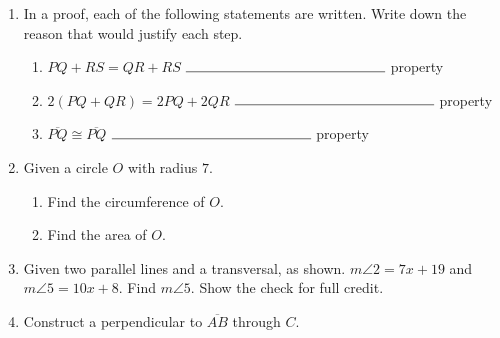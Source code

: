 \begin{enumerate}
\item In a proof, each of the following statements are written. Write down the reason that would justify each step. \bigskip
\begin{enumerate}
  \item $PQ+RS= QR+RS$  \hspace{1.7cm} $\rule{5cm}{0.15mm}$ property  \bigskip
  \item $2(PQ + QR)=2PQ+2QR$  \hspace{0.6cm} $\rule{5cm}{0.15mm}$ property \bigskip
  \item $\overline{PQ} \cong \overline{PQ}$ \hspace{4cm} $\rule{5cm}{0.15mm}$ property
\end{enumerate}

\item Given a circle $O$ with radius $7$.
\begin{enumerate}
\item Find the circumference of $O$. \vspace{2cm}
\item Find the area of $O$.
\end{enumerate}

\newpage
\item Given two parallel lines and a transversal, as shown. $m\angle 2=7x+19$ and $m\angle 5=10x+8$. Find $m\angle 5$. Show the check for full credit.
\begin{flushleft}
\end{flushleft}
\vspace{3cm}


\item Construct a perpendicular to $\overline{AB}$ through $C$.\\
\vspace{2cm}
\begin{center}
\end{center}


\end{enumerate}
